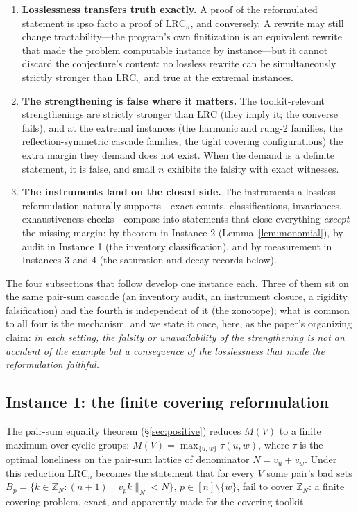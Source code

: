 \documentclass[11pt,a4paper]{article}
\numberwithin{equation}{section}
\theoremstyle{plain}
\theoremstyle{definition}
\theoremstyle{remark}
\newcommand{\Z}{\mathbb{Z}}
\newcommand{\wn}[1]{\lVert #1 \rVert_{N}}
\newcommand{\lrc}{\mathrm{LRC}}
\begin{document}
\begin{enumerate}[leftmargin=1.6em,itemsep=2pt]
\item \textbf{Losslessness transfers truth exactly.} A proof of the
reformulated statement is ipso facto a proof of $\lrc_n$, and conversely.
A rewrite may still change tractability---the program's own finitization
is an equivalent rewrite that made the problem computable instance by
instance---but it cannot discard the conjecture's content: no lossless
rewrite can be simultaneously strictly stronger than $\lrc_n$ and true
at the extremal instances.
\item \textbf{The strengthening is false where it matters.} The
toolkit-relevant strengthenings are strictly stronger than $\lrc$ (they
imply it; the converse fails), and at the extremal instances (the
harmonic and rung-2 families, the reflection-symmetric cascade families,
the tight covering configurations) the extra margin they demand does not
exist. When the demand is a definite statement, it is false, and small
$n$ exhibits the falsity with exact witnesses.
\item \textbf{The instruments land on the closed side.} The instruments a
lossless reformulation naturally supports---exact counts,
classifications, invariances, exhaustiveness checks---compose into
statements that close everything \emph{except} the missing margin: by
theorem in Instance 2 (Lemma~\ref{lem:monomial}), by audit in Instance 1
(the inventory classification), and by measurement in Instances 3 and 4
(the saturation and decay records below).
\end{enumerate}

The four subsections that follow develop one instance each. Three of
them sit on the same pair-sum cascade (an inventory audit, an instrument
closure, a rigidity falsification) and the fourth is independent of it
(the zonotope); what is common to all four is the mechanism, and we
state it once, here, as the paper's organizing claim: \emph{in each
setting, the falsity or unavailability of the strengthening is not an
accident of the example but a consequence of the losslessness that made
the reformulation faithful.}

\subsection{Instance 1: the finite covering reformulation}\label{sec:tm-covering}

The pair-sum equality theorem (\S\ref{sec:positive}) reduces
$M(V)$ to a finite maximum over cyclic groups: $M(V)=\max_{\{u,w\}}
\tau(u,w)$, where $\tau$ is the optimal loneliness on the pair-sum
lattice of denominator $N=v_u+v_w$. Under this reduction $\lrc_n$
becomes the statement that for every $V$ some pair's bad sets
$B_p=\{k\in\Z_N:(n{+}1)\wn{v_pk}<N\}$, $p\in[n]\setminus\{w\}$, fail to
cover $\Z_N$: a finite covering problem, exact, and apparently made for
the covering toolkit.
\end{document}
